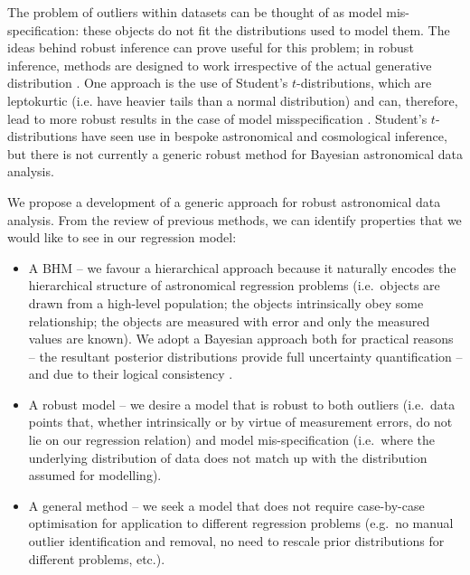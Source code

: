 \documentclass[fleqn,usenatbib]{rasti}
\begin{document}
The problem of outliers within datasets can be thought of as model
mis-specification: these objects do not fit the distributions used to model them.
The ideas behind robust inference can prove useful for this problem; in robust
inference, methods are designed to work irrespective of the actual generative
distribution \citep{Berger:1994}. One approach is the use of
Student's $t$-distributions, which are leptokurtic (i.e. have heavier tails than
a normal distribution) and can, therefore, lead to more robust results in the
case of model misspecification \citep[e.g.][]{Berger:1994, Gelman:2013}.
Student's $t$-distributions have seen use in bespoke astronomical
\citep[e.g.][]{Park:2017} and cosmological \citep[e.g.][]{Feeney:2018}
inference, but there is not currently a generic robust method for Bayesian
astronomical data analysis.

We propose a development of a generic approach for robust astronomical data
analysis. From the review of previous methods, we can identify properties that
we would like to see in our regression model:

\begin{itemize}
	\item A BHM -- we favour a hierarchical approach
	because it naturally encodes the hierarchical structure of astronomical
	regression problems (i.e.\ objects are drawn from a high-level population;
	the objects intrinsically obey some relationship; the objects are measured
	with error and only the measured values are known). We adopt a Bayesian
	approach both for practical reasons -- the resultant posterior distributions provide full uncertainty quantification -- and due to their logical consistency \citep[e.g.][]{Cox:1946, van_Horn:2003, Knuth:2010}.

	\item A robust model -- we desire a model that is robust to both outliers
	(i.e.\ data points that, whether intrinsically or by virtue of measurement
	errors, do not lie on our regression relation) and model mis-specification
	(i.e.\ where the underlying distribution of data does not match up with the
	distribution assumed for modelling).

	\item A general method -- we seek a model that does not require case-by-case
	optimisation for application to different regression problems (e.g.\ no
	manual outlier identification and removal, no need to rescale prior
	distributions for different problems, etc.).
\end{itemize}
\end{document}
